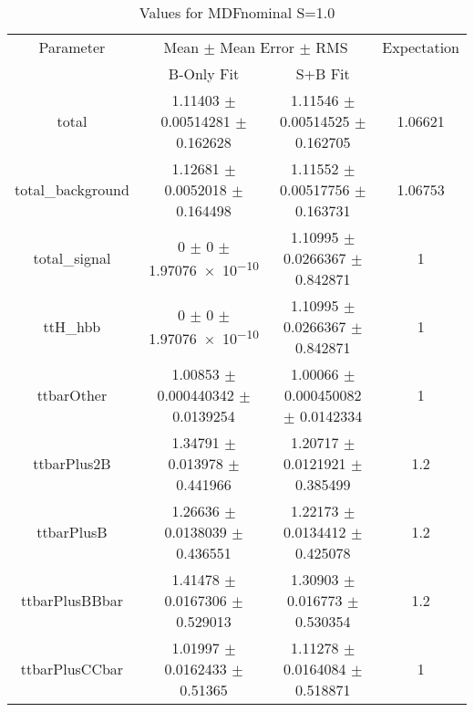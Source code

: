 \begin{table}
\centering
\caption{Values for MDFnominal S=1.0}
\begin{tabular}{cccc}
\toprule
Parameter & \multicolumn{2}{c}{Mean $\pm$ Mean Error $\pm$ RMS} & Expectation\\
 & B-Only Fit & S+B Fit & \\
\midrule
total & \num{1.11403} $\pm$ \num{0.00514281} $\pm$ \num{0.162628} & \num{1.11546} $\pm$ \num{0.00514525} $\pm$ \num{0.162705} & \num{1.06621}\\
total\_background & \num{1.12681} $\pm$ \num{0.0052018} $\pm$ \num{0.164498} & \num{1.11552} $\pm$ \num{0.00517756} $\pm$ \num{0.163731} & \num{1.06753}\\
total\_signal & \num{0} $\pm$ \num{0} $\pm$ \num{1.97076e-10} & \num{1.10995} $\pm$ \num{0.0266367} $\pm$ \num{0.842871} & \num{1}\\
ttH\_hbb & \num{0} $\pm$ \num{0} $\pm$ \num{1.97076e-10} & \num{1.10995} $\pm$ \num{0.0266367} $\pm$ \num{0.842871} & \num{1}\\
ttbarOther & \num{1.00853} $\pm$ \num{0.000440342} $\pm$ \num{0.0139254} & \num{1.00066} $\pm$ \num{0.000450082} $\pm$ \num{0.0142334} & \num{1}\\
ttbarPlus2B & \num{1.34791} $\pm$ \num{0.013978} $\pm$ \num{0.441966} & \num{1.20717} $\pm$ \num{0.0121921} $\pm$ \num{0.385499} & \num{1.2}\\
ttbarPlusB & \num{1.26636} $\pm$ \num{0.0138039} $\pm$ \num{0.436551} & \num{1.22173} $\pm$ \num{0.0134412} $\pm$ \num{0.425078} & \num{1.2}\\
ttbarPlusBBbar & \num{1.41478} $\pm$ \num{0.0167306} $\pm$ \num{0.529013} & \num{1.30903} $\pm$ \num{0.016773} $\pm$ \num{0.530354} & \num{1.2}\\
ttbarPlusCCbar & \num{1.01997} $\pm$ \num{0.0162433} $\pm$ \num{0.51365} & \num{1.11278} $\pm$ \num{0.0164084} $\pm$ \num{0.518871} & \num{1}\\
\bottomrule
\end{tabular}
\end{table}